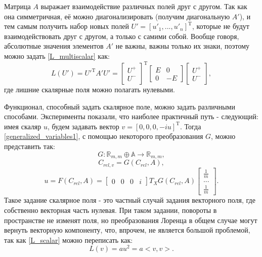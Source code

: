 Матрица $A$ выражает взаимодействие различных полей друг с другом. Так как она симметричная, её можно диагонализировать (получим диагональную $A'$), и тем самым получить
набор новых полей $U' = [u'_1, ..., u'_n]^\mathrm{T}$, которые не будут взаимодействовать друг с другом, а только с самими собой. Вообще говоря,
абсолютные значения элементов $A'$ не важны, важны только их знаки, поэтому можно задать \ref{L_multiscalar} как:
\begin{equation}
	L(U') = {U'}^\mathrm{T}A'U'={\begin{bmatrix} U^+ \\ U^- \end{bmatrix}}^\mathrm{T}\begin{bmatrix} E & 0 \\ 0 & -E \end{bmatrix}\begin{bmatrix} U^+ \\ U^- \end{bmatrix},
	\label{L_multiscalar_diag}
\end{equation}
где лишние скалярные поля можно полагать нулевыми.

Функционал, способный задать скалярное поле, можно задать различными способами. Эксперименты показали, что наиболее практичный путь - следующий:
имея скаляр $u$, будем задавать вектор $v = [0, 0, 0, -iu]^\mathrm{T}$. Тогда \ref{generalized_variables1}, с помощью некоторого преобразования $G$, можно представить так:
\begin{equation}
	G : \mathbb{R}_{m,m} \oplus \mathbb{A} \rightarrow \mathbb{R}_{m,m},
\end{equation}
\begin{equation}
	C_{rel, v} = G(C_{rel}, A),
\end{equation}
\begin{equation}
	u = F(C_{rel}, A) = \begin{bmatrix} 0 & 0 & 0 &i \end{bmatrix}T_{X}G(C_{rel}, A)\begin{bmatrix} \frac{1}{m} \\ ... \\ \frac{1}{m} \end{bmatrix}.
	\label{scalar_F}
\end{equation}
Такое задание скалярное поля - это частный случай задания векторного поля, где собственно векторная часть нулевая.
При таком задании, повороты в пространстве не изменят поля, но преобразования Лоренца в общем случае могут вернуть векторную компоненту, что, впрочем, не
является большой проблемой, так как \ref{L_scalar} можно переписать как:
\begin{equation}
	L(v) = au^2 = a<v,v>.
	\label{L_scalar_vec}
\end{equation}

